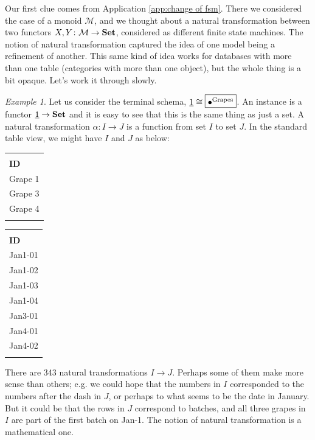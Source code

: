 \documentclass{book}
\def\tn{\textnormal}
\def\mc{\mathcal}
\def\to{\rightarrow}
\def\taking{\colon}
\def\iso{\cong}
\def\ul{\underline}
\def\Set{{\bf Set}}
\def\bhline{\Xhline{2\arrayrulewidth}}
\def\bbhline{\Xhline{2.5\arrayrulewidth}}
\def\mcM{\mc{M}}
\theoremstyle{remark}
\newtheorem{example}[subsubsection]{Example}
\theoremstyle{definition}
\begin{document}
Our first clue comes from Application \ref{app:change of fsm}. There we considered the case of a monoid $\mcM$, and we thought about a natural transformation between two functors $X,Y\taking\mcM\to\Set$, considered as different finite state machines. The notion of natural transformation captured the idea of one model being a refinement of another. This same kind of idea works for databases with more than one table (categories with more than one object), but the whole thing is a bit opaque. Let's work it through slowly.

\begin{example}\label{ex:nts on term}
Let us consider the terminal schema, $\ul{1}\iso\fbox{$\bullet^{\tn{Grapes}}$}$. An instance is a functor $\ul{1}\to\Set$ and it is easy to see that this is the same thing as just a set. A natural transformation $\alpha\taking I\to J$ is a function from set $I$ to set $J$. In the standard table view, we might have $I$ and $J$ as below:
\begin{center}
\begin{tabular}{| l ||}\bhline
\multicolumn{1}{| c |}{Grapes $(I)$}\\\bhline
{\bf ID}\\\bbhline
Grape 1\\\hline
Grape 3\\\hline
Grape 4\\\bhline
\end{tabular}
\hspace{1in}
\begin{tabular}{| l ||}\bhline
\multicolumn{1}{| c |}{Grapes $(J)$}\\\bhline
{\bf ID}\\\bbhline
Jan1-01\\\hline
Jan1-02\\\hline
Jan1-03\\\hline
Jan1-04\\\hline
Jan3-01\\\hline
Jan4-01\\\hline
Jan4-02\\\bhline
\end{tabular}
\end{center}

There are 343 natural transformations $I\to J$. Perhaps some of them make more sense than others; e.g. we could hope that the numbers in $I$ corresponded to the numbers after the dash in $J$, or perhaps to what seems to be the date in January. But it could be that the rows in $J$ correspond to batches, and all three grapes in $I$ are part of the first batch on Jan-1. The notion of natural transformation is a mathematical one.
\end{example}
\end{document}
